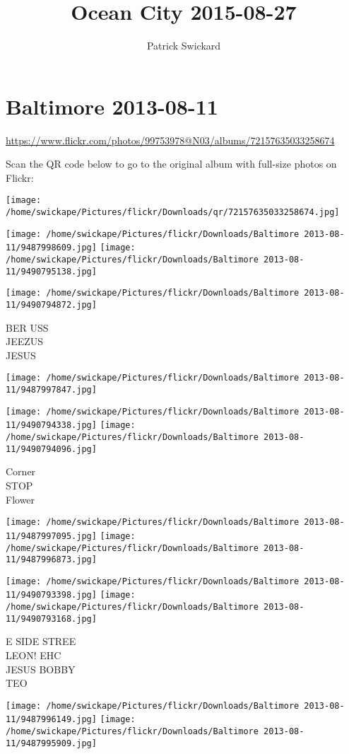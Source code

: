 \documentclass[10pt,letterpaper]{article}
\title{Ocean City 2015-08-27}
\author{Patrick Swickard}
\date{}
\begin{document}
\section*{Baltimore 2013-08-11}

\url{https://www.flickr.com/photos/99753978@N03/albums/72157635033258674}

Scan the QR code below to go to the original album with full-size photos on Flickr:

\texttt{[image: /home/swickape/Pictures/flickr/Downloads/qr/72157635033258674.jpg]}
\pagebreak

\texttt{[image: /home/swickape/Pictures/flickr/Downloads/Baltimore 2013-08-11/9487998609.jpg]}
\texttt{[image: /home/swickape/Pictures/flickr/Downloads/Baltimore 2013-08-11/9490795138.jpg]}

\texttt{[image: /home/swickape/Pictures/flickr/Downloads/Baltimore 2013-08-11/9490794872.jpg]}

BER USS\\
JEEZUS\\
JESUS
\pagebreak

\texttt{[image: /home/swickape/Pictures/flickr/Downloads/Baltimore 2013-08-11/9487997847.jpg]}

\vspace{0.25in}
\texttt{[image: /home/swickape/Pictures/flickr/Downloads/Baltimore 2013-08-11/9490794338.jpg]}
\texttt{[image: /home/swickape/Pictures/flickr/Downloads/Baltimore 2013-08-11/9490794096.jpg]}

Corner\\
STOP\\
Flower
\pagebreak

\texttt{[image: /home/swickape/Pictures/flickr/Downloads/Baltimore 2013-08-11/9487997095.jpg]}
\texttt{[image: /home/swickape/Pictures/flickr/Downloads/Baltimore 2013-08-11/9487996873.jpg]}

\texttt{[image: /home/swickape/Pictures/flickr/Downloads/Baltimore 2013-08-11/9490793398.jpg]}
\texttt{[image: /home/swickape/Pictures/flickr/Downloads/Baltimore 2013-08-11/9490793168.jpg]}

E SIDE STREE\\
LEON! EHC\\
JESUS BOBBY\\
TEO
\pagebreak

\texttt{[image: /home/swickape/Pictures/flickr/Downloads/Baltimore 2013-08-11/9487996149.jpg]}
\texttt{[image: /home/swickape/Pictures/flickr/Downloads/Baltimore 2013-08-11/9487995909.jpg]}
\end{document}
